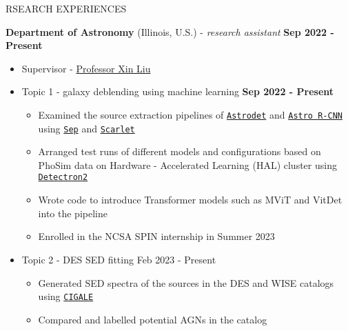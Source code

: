 \documentclass[11pt]{article}
\begin{document}
\begin{section}{RSEARCH EXPERIENCES}

\textbf{Department of Astronomy} (Illinois, U.S.) - \textit{research assistant} \hfill \textbf{Sep 2022 - Present}
\begin{itemize}[leftmargin=1.5em]
    \item Supervisor - \href{mailto:xinliuxl@illinois.edu}{Professor Xin Liu}
    \item Topic 1 - galaxy deblending using machine learning \hfill \textbf{Sep 2022 - Present}
    \begin{itemize}[leftmargin=1.5em]
        \item Examined the source extraction pipelines of \href{https://github.com/burke86/astrodet}{\texttt{Astrodet}} and \href{https://github.com/burke86/astro_rcnn}{\texttt{Astro R-CNN}} using \href{https://github.com/kbarbary/sep/tree/v1.1.x}{\texttt{Sep}} and \href{https://github.com/pmelchior/scarlet}{\texttt{Scarlet}}
        \item Arranged test runs of different models and configurations based on PhoSim data on Hardware - Accelerated Learning (HAL) cluster using \href{https://github.com/facebookresearch/detectron2}{\texttt{Detectron2}}
        \item Wrote code to introduce Transformer models such as MViT and VitDet into the pipeline
        \item Enrolled in the NCSA SPIN internship in Summer 2023
    \end{itemize}
    \item Topic 2 - DES SED fitting \hfill Feb 2023 - Present
    \begin{itemize}[leftmargin=1.5em]
        \item Generated SED spectra of the sources in the DES and WISE catalogs using \href{https://cigale.lam.fr/}{\texttt{CIGALE}} 
        \item Compared and labelled potential AGNs in the catalog
    \end{itemize}
\end{itemize}


\end{section}
\end{document}
